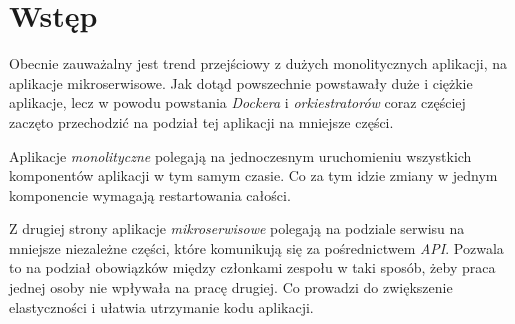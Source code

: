 \documentclass{iiuwb}
\begin{document}
\tableofcontents


\cleardoublepage
\chapter*{Wstęp}                %
\label{cha:Wstep}                       %

Obecnie zauważalny jest trend przejściowy z dużych monolitycznych 
aplikacji, na aplikacje mikroserwisowe. Jak dotąd powszechnie 
powstawały duże i ciężkie aplikacje, lecz w powodu powstania 
\textit{Dockera} i \textit{orkiestratorów} coraz częściej zaczęto przechodzić na 
podział tej aplikacji na mniejsze części.

Aplikacje \textit{monolityczne} polegają na jednoczesnym uruchomieniu 
wszystkich komponentów aplikacji w tym samym czasie. Co za tym 
idzie zmiany w jednym komponencie wymagają restartowania całości.

Z drugiej strony aplikacje \textit{mikroserwisowe} polegają na podziale 
serwisu na mniejsze niezależne części, które komunikują się za 
pośrednictwem \textit{API}. Pozwala to na podział obowiązków między 
członkami zespołu w taki sposób, żeby praca jednej osoby nie 
wpływała na pracę drugiej. Co prowadzi do zwiększenie 
elastyczności i ułatwia utrzymanie kodu aplikacji.
\end{document}
